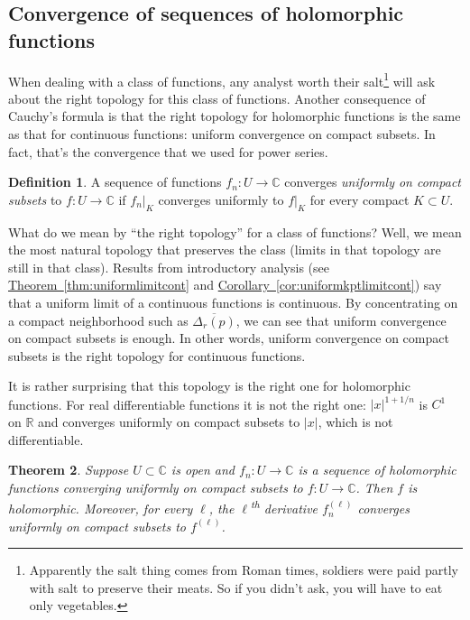 \documentclass[12pt,openany]{book}
\newcommand{\sabs}[1]{\lvert {#1} \rvert}
\newcommand{\C}{{\mathbb{C}}}
\newcommand{\R}{{\mathbb{R}}}
\newcommand{\myindex}[1]{#1\index{#1}}
\newcommand{\myquote}[1]{``#1''}
\theoremstyle{plain}
\newtheorem{thm}{Theorem}[section]
\theoremstyle{remark}
\theoremstyle{definition}
\newtheorem{defn}[thm]{Definition}
\theoremstyle{exercise}
\theoremstyle{example}
\newcommand{\thmref}[1]{\hyperref[#1]{Theorem~\ref*{#1}}}
\newcommand{\corref}[1]{\hyperref[#1]{Corollary~\ref*{#1}}}
\begin{document}
\subsection{Convergence of sequences of holomorphic functions}
\label{subsec:convergence}

When dealing with a class of functions, any analyst worth their
salt\footnote{Apparently the salt thing
comes from Roman times, soldiers were
paid partly with salt to preserve their meats.  So if you didn't ask,
you will have to eat only vegetables.} will ask about the right topology for this class of
functions.
Another consequence of Cauchy's formula is that the right topology for
holomorphic functions is the same as that for continuous functions: uniform
convergence on compact subsets.  In fact, that's the convergence that we
used for power series.

\begin{defn}
A sequence of functions $f_n \colon U \to \C$ converges
\emph{\myindex{uniformly on compact subsets}}%
to $f \colon U \to \C$ if
$f_n|_K$ converges uniformly to $f|_K$
for every compact $K \subset U$.
\end{defn}

What do we mean by \myquote{the right topology} for a class of functions?
Well, we mean the most natural
topology that preserves the class (limits in that topology are still in that
class).  
Results from introductory analysis
(see \thmref{thm:uniformlimitcont} and \corref{cor:uniformkptlimitcont})
say that a uniform limit of a continuous functions is continuous.
By concentrating on a compact neighborhood such as $\overline{\Delta_r(p)}$,
we can see that uniform convergence on compact subsets is enough.
In other words, uniform convergence on compact subsets is the right topology
for continuous functions.

It is rather surprising that this topology is the right one for holomorphic
functions.  For real
differentiable functions it is not the right one: $\sabs{x}^{1+1/n}$
is $C^1$ on $\R$ and converges uniformly on compact subsets to $\sabs{x}$,
which is not differentiable.

\begin{thm} \label{thm:unifoncompact}
Suppose $U \subset \C$ is open and $f_n \colon U \to \C$ is a sequence
of holomorphic functions converging uniformly on compact subsets to
$f \colon U \to \C$.  Then $f$ is holomorphic.
Moreover, for every $\ell$, the $\ell$\textsuperscript{th} derivative
$f_n^{(\ell)}$ converges uniformly on compact subsets to $f^{(\ell)}$.
\end{thm}
\end{document}
